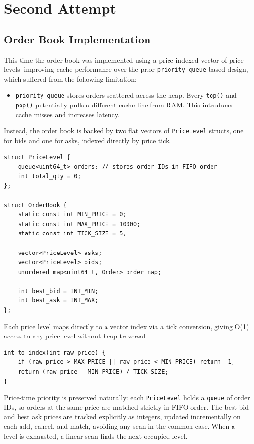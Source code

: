 \documentclass{article}
\begin{document}
\newpage
\section{Second Attempt}


\subsection{Order Book Implementation}
This time the order book was implemented using a price-indexed vector of price levels,
improving cache performance over the prior \texttt{priority\_queue}-based design, which
suffered from the following limitation:

\begin{itemize}
    \item \texttt{priority\_queue} stores orders scattered across the heap. Every
    \texttt{top()} and \texttt{pop()} potentially pulls a different cache line from RAM.
    This introduces cache misses and increases latency.
\end{itemize}

Instead, the order book is backed by two flat vectors of \texttt{PriceLevel} structs,
one for bids and one for asks, indexed directly by price tick.

\begin{lstlisting}[caption={Order Book Data Structures}]
struct PriceLevel {
    queue<uint64_t> orders; // stores order IDs in FIFO order
    int total_qty = 0;
};

struct OrderBook {
    static const int MIN_PRICE = 0;
    static const int MAX_PRICE = 10000;
    static const int TICK_SIZE = 5;

    vector<PriceLevel> asks;
    vector<PriceLevel> bids;
    unordered_map<uint64_t, Order> order_map;

    int best_bid = INT_MIN;
    int best_ask = INT_MAX;
};
\end{lstlisting}

Each price level maps directly to a vector index via a tick conversion, giving O(1)
access to any price level without heap traversal.

\begin{lstlisting}[caption={Price to Index Conversion}]
int to_index(int raw_price) {
    if (raw_price > MAX_PRICE || raw_price < MIN_PRICE) return -1;
    return (raw_price - MIN_PRICE) / TICK_SIZE;
}
\end{lstlisting}

Price-time priority is preserved naturally: each \texttt{PriceLevel} holds a
\texttt{queue} of order IDs, so orders at the same price are matched strictly in FIFO
order. The best bid and best ask prices are tracked explicitly as integers, updated
incrementally on each add, cancel, and match, avoiding any scan in the common case.
When a level is exhausted, a linear scan finds the next occupied level.
\end{document}
